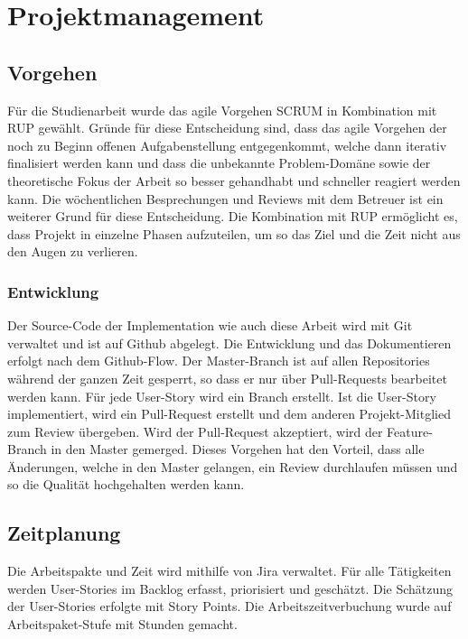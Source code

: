 
\section{Projektmanagement}
\label{sec:Projektmanagement}

\subsection{Vorgehen}
\label{sub:Vorgehen}

Für die Studienarbeit wurde das agile Vorgehen SCRUM in Kombination mit \ac{RUP} gewählt. Gründe für diese Entscheidung sind, dass das agile Vorgehen der noch zu Beginn offenen Aufgabenstellung entgegenkommt, welche dann iterativ finalisiert werden kann und dass die unbekannte Problem-Domäne sowie der theoretische Fokus der Arbeit so besser gehandhabt und schneller reagiert werden kann. Die wöchentlichen Besprechungen und Reviews mit dem Betreuer ist ein weiterer Grund für diese Entscheidung. Die Kombination mit \ac{RUP} ermöglicht es, dass Projekt in einzelne Phasen aufzuteilen, um so das Ziel und die Zeit nicht aus den Augen zu verlieren.

\subsubsection{Entwicklung}
\label{sub:Entwicklung}

Der Source-Code der Implementation wie auch diese Arbeit wird mit Git verwaltet und ist auf Github abgelegt. Die Entwicklung und das Dokumentieren erfolgt nach dem Github-Flow. Der Master-Branch ist auf allen Repositories während der ganzen Zeit gesperrt, so dass er nur über Pull-Requests bearbeitet werden kann. Für jede User-Story wird ein Branch erstellt. Ist die User-Story implementiert, wird ein Pull-Request erstellt und dem anderen Projekt-Mitglied zum Review übergeben. Wird der Pull-Request akzeptiert, wird der Feature-Branch in den Master gemerged. Dieses Vorgehen hat den Vorteil, dass alle Änderungen, welche in den Master gelangen, ein Review durchlaufen müssen und so die Qualität hochgehalten werden kann.


\subsection{Zeitplanung}
\label{sub:Zeitplanung}

Die Arbeitspakte und Zeit wird mithilfe von Jira verwaltet. Für alle Tätigkeiten werden User-Stories im Backlog erfasst, priorisiert und geschätzt. Die Schätzung der User-Stories erfolgte mit Story Points. Die Arbeitszeitverbuchung wurde auf Arbeitspaket-Stufe mit Stunden gemacht.

